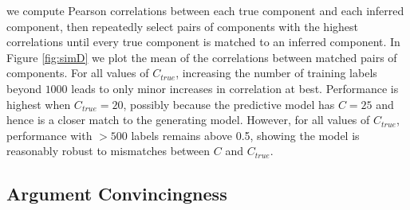 we compute Pearson correlations between each
true component and each inferred component, then repeatedly select pairs of components with the highest correlations
 until every true component is matched to an inferred component. 
In Figure \ref{fig:simD} we plot the mean of the correlations between matched pairs of components.
For all values of $C_{true}$, increasing the
number of training labels beyond $1000$ leads to only minor increases in correlation at best. 
Performance is highest when $C_{true} = 20$,
possibly because the predictive model has $C = 25$
and hence is a closer match to the generating model.
However, for all values of $C_{true}$, performance with $>500$ labels remains above 0.5,
 showing the model is reasonably robust
to mismatches between $C$ and $C_{true}$.

\subsection{Argument Convincingness}\label{sec:exp_scale}



